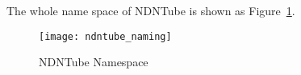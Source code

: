 The whole name space of NDNTube is shown as Figure~\ref{fig:ndntube_naming}.

\begin{figure}%
  \centering
  \texttt{[image: ndntube\_naming]}
  \caption{NDNTube Namespace}
  \label{fig:ndntube_naming}
\end{figure}

